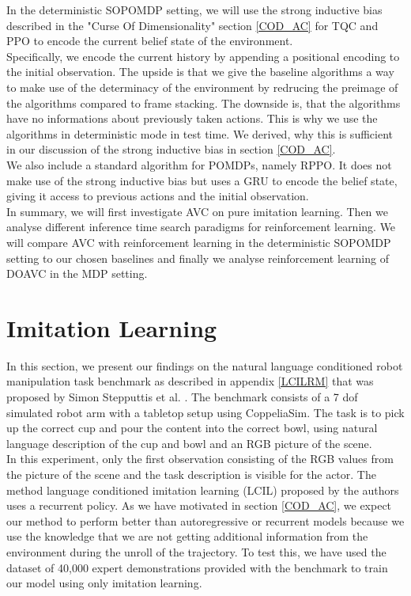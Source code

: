 In the deterministic SOPOMDP setting, we will use the strong inductive bias described in the "Curse Of Dimensionality" 
section \ref{COD_AC} for TQC and PPO to encode the current belief state of the environment. \\
Specifically, we encode the current history by appending a positional encoding to the initial observation. The upside is that we give 
the baseline algorithms a way to make use of the determinacy of the environment by redrucing the preimage of the algorithms compared to 
frame stacking. The downside is, that the algorithms have no informations about previously taken actions. This is why we use the 
algorithms in deterministic mode in test time. We derived, why this is sufficient in our discussion of the strong inductive bias in 
section \ref{COD_AC}.\\

We also include a standard algorithm for POMDPs, namely RPPO. It does not make use of the strong inductive bias but uses a GRU 
to encode the belief state, giving it access to previous actions and the initial observation.\\


In summary, we will first investigate AVC on pure imitation learning. Then we analyse different inference time search 
paradigms for reinforcement learning. We will compare AVC with reinforcement learning in the deterministic SOPOMDP setting to our chosen baselines and finally we analyse 
reinforcement learning of DOAVC in the MDP setting.


\section{Imitation Learning}
\label{sec:exp_imi_lr}
In this section, we present our findings on the natural language conditioned robot manipulation task benchmark as described in appendix \ref{LCILRM} that was proposed by 
Simon Stepputtis et al. \cite{stepputtis2020languageconditioned}. The benchmark consists of a 7 dof simulated robot arm with a 
tabletop setup using CoppeliaSim. The task is to pick 
up the correct cup and pour the content into the correct bowl, using natural language description of the cup and bowl and an RGB 
picture of the scene.\\

In this experiment, only the first observation consisting of the RGB values from the picture of the 
scene and the task description is visible for the actor. The method language conditioned imitation learning (LCIL)
proposed by the authors uses a recurrent policy. As we have motivated in section \ref{COD_AC}, we expect our method to perform better than autoregressive or recurrent 
models because we use the knowledge that we are not getting additional information from the environment during the unroll of the trajectory. 
To test this, we have used the dataset of 40,000 expert demonstrations provided with the benchmark to train our model using only imitation learning.\\

